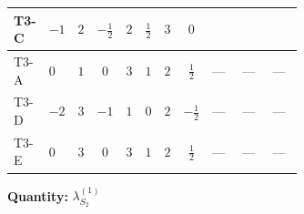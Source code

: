 \documentclass[8pt]{article}
\begin{document}
\begin{landscape}
\begin{longtable}{@{}llcccccc >{\raggedright\arraybackslash}p{0.21\linewidth} >{\raggedright\arraybackslash}p{0.21\linewidth} >{\raggedright\arraybackslash}p{0.21\linewidth}@{}}
\midrule
T3-C & $-1$ & $2$ & $-\frac{1}{2}$ & $2$ & $\frac{1}{2}$ & $3$ & $0$ & \scriptsize\adjustbox{max width=\linewidth}{$\begin{gathered} +\frac{9 {g_2}^4}{4}\end{gathered}$} & \scriptsize\adjustbox{max width=\linewidth}{$\begin{gathered} +{g_1}^2 \left(\frac{3 {g_2}^2}{2}-3 {\lambda_{S_2}^{(1)}}\right)\end{gathered}$} & \scriptsize\adjustbox{max width=\linewidth}{$\begin{gathered} -9 {g_2}^2 {\lambda_{S_2}^{(1)}}\end{gathered}$} \\
\midrule
T3-A & $0$ & $1$ & $0$ & $3$ & $1$ & $2$ & $\frac{1}{2}$ & --- & --- & --- \\
\midrule
T3-D & $-2$ & $3$ & $-1$ & $1$ & $0$ & $2$ & $-\frac{1}{2}$ & --- & --- & --- \\
\midrule
T3-E & $0$ & $3$ & $0$ & $3$ & $1$ & $2$ & $\frac{1}{2}$ & --- & --- & --- \\
\midrule
\bottomrule
\end{longtable}
\clearpage
\noindent\textbf{Quantity: }$\lambda_{S_2}^{(1)}$\par\smallskip

\end{landscape}
\end{document}
